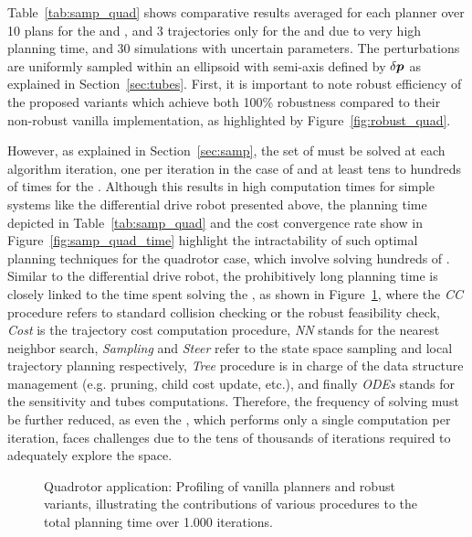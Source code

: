 Table~\ref{tab:samp_quad} shows comparative results averaged for each planner over 10 plans for the  and , and 3 trajectories only for the  and  due to very high planning time, and 30 simulations with uncertain parameters. 
The perturbations are uniformly sampled within an ellipsoid with semi-axis defined by $\delta \boldsymbol{p}$ as explained in Section~\ref{sec:tubes}.
First, it is important to note robust efficiency of the proposed  variants which achieve both 100\% robustness compared to their non-robust vanilla implementation, as highlighted by Figure~\ref{fig:robust_quad}.

However, as explained in Section~\ref{sec:samp}, the set of  must be solved at each algorithm iteration, one per iteration in the case of  and at least tens to hundreds of times for the .
Although this results in high computation times for simple systems like the differential drive robot presented above, the planning time depicted in Table~\ref{tab:samp_quad} and the cost convergence rate show in Figure~\ref{fig:samp_quad_time} highlight the intractability of such optimal planning techniques for the quadrotor case, which involve solving hundreds of .
Similar to the differential drive robot, the prohibitively long planning time is closely linked to the time spent solving the , as shown in Figure~\ref{fig:profiling_quad}, where the \emph{CC} procedure refers to standard collision checking or the robust feasibility check, \emph{Cost} is the trajectory cost computation procedure, \emph{NN} stands for the nearest neighbor search, \emph{Sampling} and \emph{Steer} refer to the state space sampling and local trajectory planning respectively, \emph{Tree} procedure is in charge of the data structure management (e.g. pruning, child cost update, etc.), and finally \emph{ODEs} stands for the sensitivity and tubes computations.
Therefore, the frequency of  solving must be further reduced, as even the , which performs only a single computation per iteration, faces challenges due to the tens of thousands of iterations required to adequately explore the space.

\begin{figure} [t!]
    \centering
     
    \caption{Quadrotor application: Profiling of vanilla planners and robust variants, illustrating the contributions of various procedures to the total planning time over 1.000 iterations.
    }%
    \label{fig:profiling_quad}%
\end{figure}

